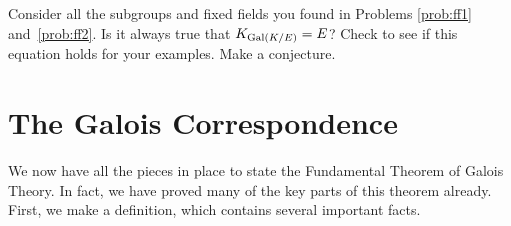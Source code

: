 \begin{problem}
 Consider all the subgroups and fixed fields you found in Problems \ref{prob:ff1} and~\ref{prob:ff2}.  Is it always true that $K_{\operatorname{Gal}(K/E)} = E$?  Check to see if this equation holds for your examples.  Make a conjecture.
\end{problem}

\section{The Galois Correspondence}

We now have all the pieces in place to state the Fundamental Theorem of Galois Theory. In fact, we have proved many of the key parts of this theorem already. First, we make a definition, which contains several important facts.

